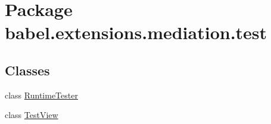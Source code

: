 \hypertarget{namespacebabel_1_1extensions_1_1mediation_1_1test}{\section{Package babel.\-extensions.\-mediation.\-test}
\label{namespacebabel_1_1extensions_1_1mediation_1_1test}
}
\subsection*{Classes}
\begin{DoxyCompactItemize}
\item 
class \hyperlink{classbabel_1_1extensions_1_1mediation_1_1test_1_1_runtime_tester}{Runtime\-Tester}
\item 
class \hyperlink{classbabel_1_1extensions_1_1mediation_1_1test_1_1_test_view}{Test\-View}
\end{DoxyCompactItemize}
